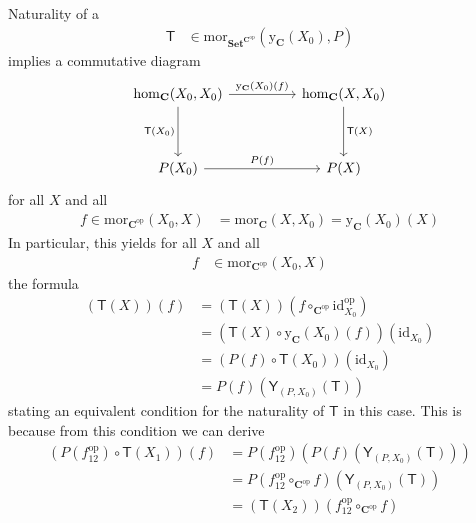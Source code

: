 \begin{prf}
Naturality of a
\begin{align*}
  \mathsf{T}
  &\in
  \mathrm{mor}_{\mathbf{Set}^{\mathbf{C}^{\mathrm{op}}}}
  (\mathrm{y}_{\mathbf{C}}(X_{0}),P)
\end{align*}
implies a commutative diagram
\[
\begin{tikzcd}[sep=huge]
  \mathrm{hom}_{\mathbf{C}}(X_{0},X_{0})
  \arrow{r}{\mathrm{y}_{\mathbf{C}}(X_{0})(f)}
  \arrow[swap]{d}{\mathsf{T}(X_{0})}
  &
  \mathrm{hom}_{\mathbf{C}}(X,X_{0})
  \arrow{d}{\mathsf{T}(X)}
  \\
  P(X_{0})
  \arrow{r}{P(f)}
  &
  P(X)
\end{tikzcd}
\]
for all $X$ and all
\begin{align*}
  f
  \in
  \mathrm{mor}_{\mathbf{C}^{\mathrm{op}}}(X_{0},X)
  &=
  \mathrm{mor}_{\mathbf{C}}(X,X_{0})
  =
  \mathrm{y}_{\mathbf{C}}(X_{0})(X)
\end{align*}  
In particular, this yields for all $X$ and all
\begin{align*}
  f
  &\in
  \mathrm{mor}_{\mathbf{C}^{\mathrm{op}}}(X_{0},X)
\end{align*}
the formula
\begin{align*}
  (\mathsf{T}(X))(f)
  &=
  (\mathsf{T}(X))
  \left(
    f
    \circ_{\mathbf{C}^{\mathrm{op}}}
    \mathrm{id}_{X_{0}}^{\mathrm{op}}
  \right)
  \\
  &=
  \left(
    \mathsf{T}(X)
    \circ
    \mathrm{y}_{\mathbf{C}}(X_{0})(f)
  \right)
  (\mathrm{id}_{X_{0}})
  \\
  &=
  \left(
    P(f)
    \circ
    \mathsf{T}(X_{0})
  \right)
  (\mathrm{id}_{X_{0}})
  \tag{NT}
  \\
  &=
  P(f)(\mathsf{Y}_{(P,X_{0})}(\mathsf{T}))
\end{align*}
stating an equivalent condition for the naturality of $\mathsf{T}$ in this case. This is because from this condition we can derive
\begin{align*}
  \left(
    P(f_{12}^{\textrm{op}})
    \circ
    \mathsf{T}(X_{1})
  \right)
  (f)
  &=
  P(f_{12}^{\textrm{op}})
  \left(
    P(f)(\mathsf{Y}_{(P,X_{0})}(\mathsf{T}))
  \right)
  \\
  &=
  P
  \left(
    f_{12}^{\textrm{op}}
    \circ_{\mathbf{C}^{\textrm{op}}}
    f
  \right)
  (\mathsf{Y}_{(P,X_{0})}(\mathsf{T}))
  \\
  &=
  (\mathsf{T}(X_{2}))
  \left(
    f_{12}^{\textrm{op}}
    \circ_{\mathbf{C}^{\textrm{op}}}
    f
  \right)
  \\

\end{align*}
\end{prf}
